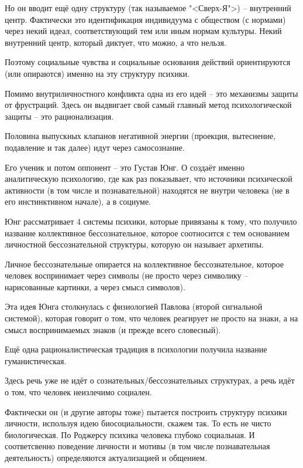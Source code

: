 \documentclass[main.tex]{subfiles}
\begin{document}
Но он вводит ещё одну структуру (так называемое "<Сверх-Я">) -- внутренний центр.
Фактически это идентификация индивидуума с обществом (с нормами) через некий идеал, соответствующий тем или иным нормам культуры.
Некий внутренний центр, который диктует, что можно, а что нельзя.

Поэтому социальные чувства и социальные основания действий ориентируются (или опираются) именно на эту структуру психики.


Помимо внутриличностного конфликта одна из его идей -- это механизмы защиты от фрустраций.
Здесь он выдвигает свой самый главный метод психологической защиты -- это рационализация.

Половина выпускных клапанов негативной энергии (проекция, вытеснение, подавление и так далее) идут через самосознание.
\\


Его ученик и потом оппонент -- это Густав Юнг.
О создаёт именно аналитическую психологию, где как раз показывает, что источники психической активности (в том числе и познавательной) находятся не внутри человека (не в его инстинктивном начале), а в социуме.

Юнг рассматривает 4 системы психики, которые привязаны к тому, что получило название коллективное бессознательное, которое соотносится с тем основанием личностной бессознательной структуры, которую он называет архетипы.

Личное бессознательные опирается на коллективное бессознательное, которое человек воспринимает через символы (не просто через символику -- нарисованные картинки, а через смысл символов).

Эта идея Юнга столкнулась с физиологией Павлова (второй сигнальной системой), которая говорит о том, что человек реагирует не просто на знаки, а на смысл воспринимаемых знаков (и прежде всего словесный).


Ещё одна рационалистическая традиция в психологии получила название гуманистическая.

Здесь речь уже не идёт о сознательных/бессознательных структурах, а речь идёт о том, что человек неизлечимо социален.

Фактически он (и другие авторы тоже) пытается построить структуру психики личности, используя идею биосоциальности, скажем так.
То есть не чисто биологическая.
По Роджерсу психика человека глубоко социальная.
И соответсвенно поведение личности и мотивы (в том числе познавательная деятельность) определяются актуализацией и общением.
\end{document}
